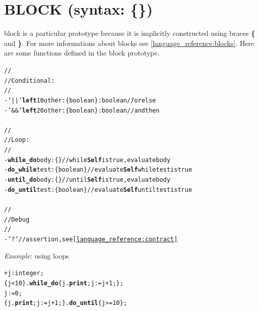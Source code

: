\documentclass[11pt]{mybook}
\begin{document}
\section{BLOCK (syntax: \{\})}
\label{library:block}
%
{\sc{}block} is a particular prototype because it is implicitly constructed using braces {\bf{}\{} and {\bf{}\}}.
For more informations about blocks see {\ref{language_reference:blocks}}.
Here are some functions defined in the {\sc{}block} prototype.
\begin{alltt}
\begin{tabbing}
  //\\
  // Conditional :\\
  //\\
  - '||' {\bf{}left} 10 other:{\sc{}\{boolean\}} :{\sc{}boolean}\= // or else  \\
  - '&&' {\bf{}left} 20 other:{\sc{}\{boolean\}} :{\sc{}boolean}       \> // and then \\
\\
  //\\
  // Loop :\\
  // \\
  - {\bf{}while\_do} body:{\sc{}\{\}}                        \> // while {\bf{}Self} is {\sc{}true}, evaluate body\\
  - {\bf{}do\_while} test:{\sc{}\{boolean\}}                 \> // evaluate {\bf{}Self} while test is {\sc{}true}\\
  - {\bf{}until\_do} body:{\sc{}\{\}}                        \> // until {\bf{}Self} is {\sc{}true}, evaluate body\\
  - {\bf{}do\_until} test:{\sc{}\{boolean\}}                 \> // evaluate {\bf{}Self} until test is {\sc{}true}\\
\\
  //\\
  // Debug\\
  // \\
  - '?'                                         \> // assertion, see {\ref{language_reference:contract}}\\
\end{tabbing}
\end{alltt}

{\it{}Example}: using loops
\begin{alltt}
   + j:{\sc{}integer};
   \{ j < 10 \}.{\bf{}while\_do} \{ j.{\bf{}print}; j := j + 1; \};
   j := 0;
   \{ j.{\bf{}print}; j := j + 1; \}.{\bf{}do\_until} \{ j >= 10 \};
\end{alltt}     
\end{document}
